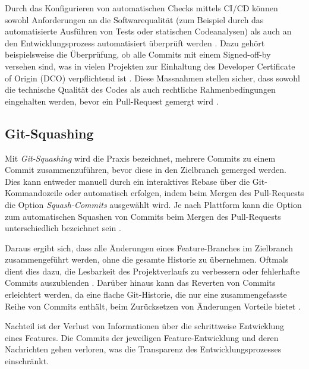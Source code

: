 Durch das Konfigurieren von automatischen Checks mittels CI/CD können sowohl Anforderungen an die Softwarequalität (zum Beispiel durch das automatisierte Ausführen von Tests oder statischen Codeanalysen) als auch an den Entwicklungsprozess automatisiert überprüft werden \parencite{kinsman_how_2021}. Dazu gehört beispielsweise die Überprüfung, ob alle Commits mit einem Signed-off-by versehen sind, was in vielen Projekten zur Einhaltung des Developer Certificate of Origin (DCO) verpflichtend ist \parencite{holtgrave_attributing_2025}. Diese Massnahmen stellen sicher, dass sowohl die technische Qualität des Codes als auch rechtliche Rahmenbedingungen eingehalten werden, bevor ein Pull-Request gemergt wird \parencite{noauthor_about_nodate}. 

\subsection{Git-Squashing}
\label{sec:GitSquashing}
Mit \textit{Git-Squashing} wird die Praxis bezeichnet, mehrere Commits zu einem Commit zusammenzuführen, bevor diese in den Zielbranch gemerged werden. Dies kann entweder manuell durch ein interaktives Rebase über die Git-Kommandozeile oder automatisch erfolgen, indem beim Mergen des Pull-Requests die Option \textit{Squash-Commits} ausgewählt wird. \parencite{noauthor_git_nodate} Je nach Plattform kann die Option zum automatischen Squashen von Commits beim Mergen des Pull-Requests unterschiedlich bezeichnet sein \parencite{noauthor_about_nodate} \parencite{noauthor_squash_nodate}.

Daraus ergibt sich, dass alle Änderungen eines Feature-Branches im Zielbranch zusammengeführt werden, ohne die gesamte Historie zu übernehmen. Oftmals dient dies dazu, die Lesbarkeit des Projektverlaufs zu verbessern oder fehlerhafte Commits auszublenden \parencite{codoban_comparative_2015}. Darüber hinaus kann das Reverten von Commits erleichtert werden, da eine flache Git-Historie, die nur eine zusammengefasste Reihe von Commits enthält, beim Zurücksetzen von Änderungen Vorteile bietet \parencite{just_switching_2016}.

Nachteil ist der Verlust von Informationen über die schrittweise Entwicklung eines Features. Die Commits der jeweiligen Feature-Entwicklung und deren Nachrichten gehen verloren, was die Transparenz des Entwicklungsprozesses einschränkt. \parencite{codoban_comparative_2015}

